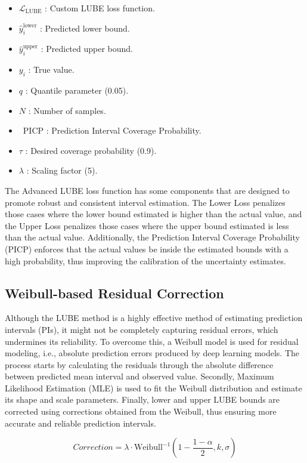 \begin{itemize}
    \item \( \mathcal{L}_{\text{LUBE}} \) : Custom LUBE loss function.
    \item \( \hat{y}_i^{\text{lower}} \) : Predicted lower bound.
    \item \( \hat{y}_i^{\text{upper}} \) : Predicted upper bound.
    \item \( y_i \) : True value.
    \item \( q \) : Quantile parameter (0.05).
    \item \( N \) : Number of samples.
    \item \ PICP : Prediction Interval Coverage Probability.
    \item \( \tau \) : Desired coverage probability (0.9).
    \item \( \lambda \) : Scaling factor (5).
\end{itemize}


The Advanced LUBE loss function has some components that are designed to promote robust and consistent interval estimation. The Lower Loss penalizes those cases where the lower bound estimated is higher than the actual value, and the Upper Loss penalizes those cases where the upper bound estimated is less than the actual value. Additionally, the Prediction Interval Coverage Probability (PICP) enforces that the actual values be inside the estimated bounds with a high probability, thus improving the calibration of the uncertainty estimates.

\subsection{Weibull-based Residual Correction}
Although the LUBE method is a highly effective method of estimating prediction intervals (PIs), it might not be completely capturing residual errors, which undermines its reliability. To overcome this, a Weibull model is used for residual modeling, i.e., absolute prediction errors produced by deep learning models. The process starts by calculating the residuals through the absolute difference between predicted mean interval and observed value. Secondly, Maximum Likelihood Estimation (MLE) is used to fit the Weibull distribution and estimate its shape and scale parameters. Finally, lower and upper LUBE bounds are corrected using corrections obtained from the Weibull, thus ensuring more accurate and reliable prediction intervals.

\begin{equation}
    Correction = \lambda \cdot \text{Weibull}^{-1} \left( 1 - \frac{1 - \alpha}{2}, k, \sigma \right)
\label{Equation 6}
\end{equation}

